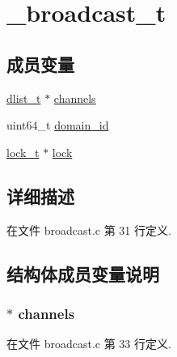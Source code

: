 \hypertarget{struct__broadcast__t}{}\section{\+\_\+broadcast\+\_\+t}
\label{struct__broadcast__t}
\subsection*{成员变量}
\begin{DoxyCompactItemize}
\item 
\hyperlink{config_8h_ad6644d67df4b4e3596c1eb12977d1d16}{dlist\+\_\+t} $\ast$ \hyperlink{struct__broadcast__t_a1aba33b919962f74be63c7e60b5439be}{channels}
\item 
uint64\+\_\+t \hyperlink{struct__broadcast__t_a2243d1c6a9d72aeb7c6d6e5331d5d64f}{domain\+\_\+id}
\item 
\hyperlink{config_8h_ad3e00e0eb0c79dfd77ff2ff833f49c7d}{lock\+\_\+t} $\ast$ \hyperlink{struct__broadcast__t_abf14bc3bc3eb5e72e92811fcc36b5063}{lock}
\end{DoxyCompactItemize}


\subsection{详细描述}


在文件 broadcast.\+c 第 31 行定义.



\subsection{结构体成员变量说明}
\hypertarget{struct__broadcast__t_a1aba33b919962f74be63c7e60b5439be}{}
\subsubsection[{channels}]{$\ast$ channels}\label{struct__broadcast__t_a1aba33b919962f74be63c7e60b5439be}


在文件 broadcast.\+c 第 33 行定义.

\hypertarget{struct__broadcast__t_a2243d1c6a9d72aeb7c6d6e5331d5d64f}{}
